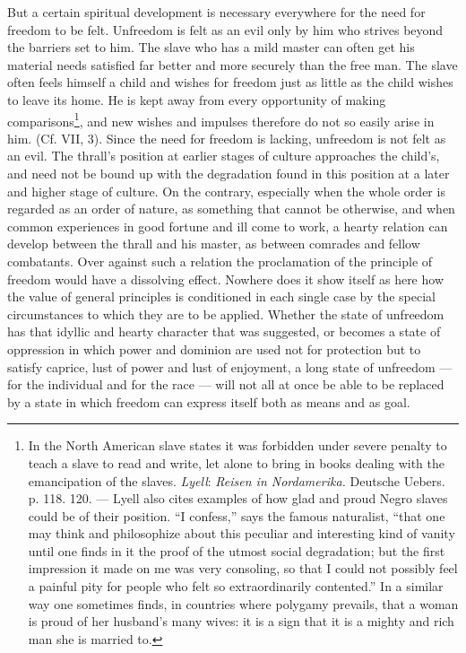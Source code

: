 \documentclass[12pt,a4paper,openany]{book}
\newcommand{\opage}[1]{\marginnote{\footnotesize\textit{[#1]}}}
\begin{document}
But a certain spiritual development is necessary everywhere for the need for freedom to be felt. Unfreedom is felt as an
evil only by him who strives beyond the barriers set to him. The slave who has a mild master can often get his material
needs satisfied far better and more securely than the free man. The slave often feels himself a child and wishes for
freedom just as little as the child wishes to leave its home. He is kept away from every opportunity of making
comparisons\footnote[1]{In the North American slave states it was forbidden under severe penalty to teach a slave to read
and write, let alone to bring in books dealing with the emancipation of the slaves. \emph{Lyell}: \textit{Reisen in
Nordamerika.} Deutsche Uebers. p. 118. 120. --- Lyell also cites examples of how glad and proud Negro slaves could be of
their position. ``I confess,'' says the famous naturalist, ``that one may think and philosophize about this peculiar and
interesting kind of vanity until one finds in it the proof of the utmost social degradation; but the first impression it
made on me was very consoling, so that I could not possibly feel a painful pity for people who felt so extraordinarily
contented.''%
In a similar way one sometimes finds, in countries where polygamy prevails, that a woman is proud of her husband's many
wives: it is a sign that it is a mighty and rich man she is married to.}, and new wishes and impulses therefore do not so
easily arise in him. (Cf. VII, 3). Since the need for freedom is lacking, unfreedom is not felt as an evil. The thrall's
position at earlier stages of culture approaches the child's, and need not be bound up with
\opage{351}the degradation found in this position at a later and higher stage of culture. On the contrary, especially
when the whole order is regarded as an order of nature, as something that cannot be otherwise, and when common experiences
in good fortune and ill come to work, a hearty relation can develop between the thrall and his master, as between
comrades and fellow combatants. Over against such a relation the proclamation of the principle of freedom would have a
dissolving effect. Nowhere does it show itself as here how the value of general principles is conditioned in each single
case by the special circumstances to which they are to be applied. Whether the state of unfreedom has that idyllic and
hearty character that was suggested, or becomes a state of oppression in which power and dominion are used not for
protection but to satisfy caprice, lust of power and lust of enjoyment, a long state of unfreedom --- for the individual
and for the race --- will not all at once be able to be replaced by a state in which freedom can express itself both as
means and as goal.
\end{document}

